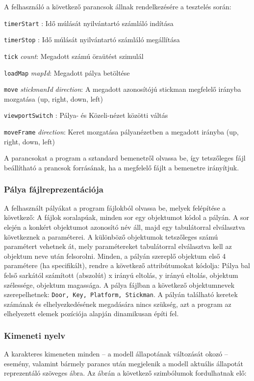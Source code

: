 	    A felhasználó a következő parancsok állnak rendelkezésére a tesztelés során:
	    
	    \newcommand{\cmd}[1]{\item{\texttt{#1}} }
	    \begin{description}
	        \cmd{timerStart}: Idő múlását nyilvántartó számláló indítása
	        \cmd{timerStop}: Idő múlását nyilvántartó számláló megállítása
	        \cmd{tick} \emph{count}: Megadott számú öraütést szimulál
	        \cmd{loadMap} \emph{mapId}: Megadott pálya betöltése
	        \cmd{move} \emph{stickmanId} \emph{direction}: A megadott azonosítójú stickman megfelelő irányba mozgatása (up, right, down, left)
	        \cmd{viewportSwitch}: Pálya- és Közeli-nézet közötti váltás
	        \cmd{moveFrame} \emph{direction}: Keret mozgatása pályanézetben a megadott irányba (up, right, down, left)
        \end{description}
        
        A parancsokat a program a sztandard bemenetről olvassa be, így tetszőleges fájl beállítható a prancsok forrásának, ha a megfelelő fájlt a bemenetre irányítjuk.
        
        \subsubsection{Pálya fájlreprezentációja}
        A felhasznált pályákat a program fájlokból olvassa be, melyek felépítése a következő: A fájlok soralapúak, minden sor egy objektumot kódol a pályán. A sor elején a konkért objektumot azonosító név áll, majd egy tabulátorral elválasztva következnek a paraméterei. A különböző objektumok tetszőleges számú paramétert vehetnek át, mely paramétereket tabulátorral elválasztva kell az objektum neve után felsorolni. Minden, a pályán szereplő objektum első 4 paramétere (ha specifikált), rendre a következő attribútumokat kódolja: Pálya bal felső sarkától számított (abszolút) x irányú eltolás, y irányú eltolás, objektum szélessége, objektum magassága. A pálya fájlban a következő objektumnevek szerepelhetnek: \texttt{Door, Key, Platform, Stickman}. A pályán található keretek számának és elhelyezkedésének megadására nincs szükség, azt a program az elhelyezett elemek pozíciója alapján dinamikusan építi fel.
        
	    \subsubsection{Kimeneti nyelv}	
	    A karakteres kimeneten minden -- a modell állapotának változását okozó -- esemény, valamint bármely parancs után megjelenik a modell aktuális állapotát reprezentáló szöveges ábra. Az ábrán a következő szimbólumok fordulhatnak elő:
	    
